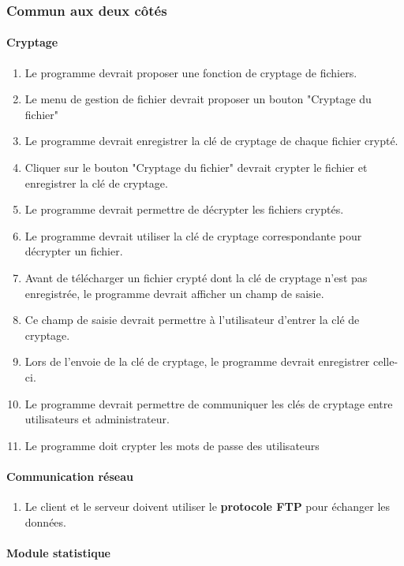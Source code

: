 \documentclass[10pt,a4paper]{report}
\begin{document}
\subsubsection{Commun aux deux côtés}
\paragraph{Cryptage}
	\begin{enumerate}
		\item Le programme devrait proposer une fonction de cryptage de fichiers.
		\item Le menu de gestion de fichier devrait proposer un bouton "Cryptage du fichier"
		\item Le programme devrait enregistrer la clé de cryptage de chaque fichier crypté.
		\item Cliquer sur le bouton "Cryptage du fichier" devrait crypter le fichier et enregistrer la clé de cryptage.
		\item Le programme devrait permettre de décrypter les fichiers cryptés.
		\item Le programme devrait utiliser la clé de cryptage correspondante pour décrypter un fichier.
		\item Avant de télécharger un fichier crypté dont la clé de cryptage n'est pas enregistrée, le programme devrait afficher un champ de saisie.
		\item Ce champ de saisie devrait permettre à l'utilisateur d'entrer la clé de cryptage.
		\item Lors de l'envoie de la clé de cryptage, le programme devrait enregistrer celle-ci.
		\item Le programme devrait permettre de communiquer les clés de cryptage entre utilisateurs et administrateur.
		\item Le programme doit crypter les mots de passe des utilisateurs
	\end{enumerate}
	
\paragraph{Communication réseau}

	\begin{enumerate}
		\item Le client et le serveur doivent utiliser le \textbf{protocole FTP} pour échanger les données.
	\end{enumerate}
	
\paragraph{Module statistique }
\end{document}
